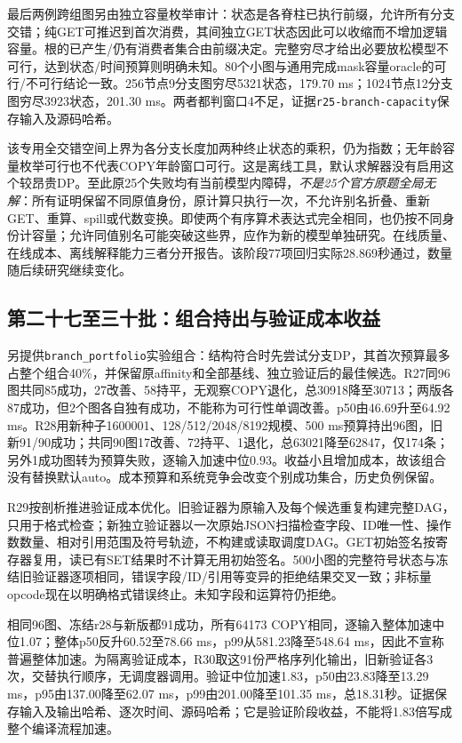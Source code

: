 \documentclass[UTF8,11pt,fontset=fandol]{ctexart}
\begin{document}
最后两例跨组图另由独立容量枚举审计：状态是各脊柱已执行前缀，允许所有分支交错；纯GET可推迟到首次消费，其间独立GET状态因此可以收缩而不增加逻辑容量。根的已产生/仍有消费者集合由前缀决定。完整穷尽才给出必要放松模型不可行，达到状态/时间预算则明确未知。80个小图与通用完成mask容量oracle的可行/不可行结论一致。256节点9分支图穷尽5321状态，179.70 ms；1024节点12分支图穷尽3923状态，201.30 ms。两者都判窗口4不足，证据\texttt{r25-branch-capacity}保存输入及源码哈希。

该专用全交错空间上界为各分支长度加两种终止状态的乘积，仍为指数；无年龄容量枚举可行也不代表COPY年龄窗口可行。这是离线工具，默认求解器没有启用这个较昂贵DP。至此原25个失败均有当前模型内障碍，\emph{不是25个官方原题全局无解}：所有证明保留不同原值身份，原计算只执行一次，不允许别名折叠、重新GET、重算、spill或代数变换。即使两个有序算术表达式完全相同，也仍按不同身份计容量；允许同值别名可能突破这些界，应作为新的模型单独研究。在线质量、在线成本、离线解释能力三者分开报告。该阶段77项回归实际28.869秒通过，数量随后续研究继续变化。

\subsection{第二十七至三十批：组合持出与验证成本收益}
另提供\texttt{branch\_portfolio}实验组合：结构符合时先尝试分支DP，其首次预算最多占整个组合40\%，并保留原affinity和全部基线、独立验证后的最佳候选。R27同96图共同85成功，27改善、58持平，无观察COPY退化，总30918降至30713；两版各87成功，但2个图各自独有成功，不能称为可行性单调改善。p50由46.69升至64.92 ms。R28用新种子1600001、128/512/2048/8192规模、500 ms预算持出96图，旧新91/90成功；共同90图17改善、72持平、1退化，总63021降至62847，仅174条；另外1成功图转为预算失败，逐输入加速中位0.93。收益小且增加成本，故该组合没有替换默认auto。成本预算和系统竞争会改变个别成功集合，历史负例保留。

R29按剖析推进验证成本优化。旧验证器为原输入及每个候选重复构建完整DAG，只用于格式检查；新独立验证器以一次原始JSON扫描检查字段、ID唯一性、操作数数量、相对引用范围及符号轨迹，不构建或读取调度DAG。GET初始签名按寄存器复用，读已有SET结果时不计算无用初始签名。500小图的完整符号状态与冻结旧验证器逐项相同，错误字段/ID/引用等变异的拒绝结果交叉一致；非标量opcode现在以明确格式错误终止。未知字段和运算符仍拒绝。

相同96图、冻结r28与新版都91成功，所有64173 COPY相同，逐输入整体加速中位1.07；整体p50反升60.52至78.66 ms，p99从581.23降至548.64 ms，因此不宣称普遍整体加速。为隔离验证成本，R30取这91份严格序列化输出，旧新验证各3次，交替执行顺序，无调度器调用。验证中位加速1.83，p50由23.83降至13.29 ms，p95由137.00降至62.07 ms，p99由201.00降至101.35 ms，总18.31秒。证据保存输入及输出哈希、逐次时间、源码哈希；它是验证阶段收益，不能将1.83倍写成整个编译流程加速。
\end{document}
